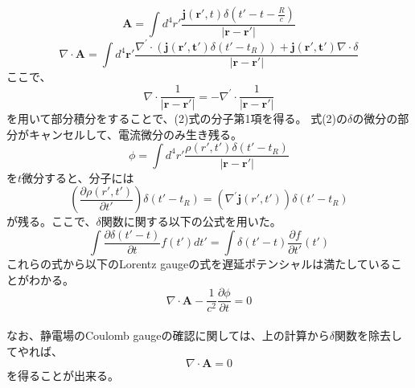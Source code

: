 \documentclass{jarticle}
\title{}
\author{}
\begin{document}
\maketitle

\begin{equation}
\bm{A} = \int d^4r' \frac{\bm{j}(\bm{r'},t)\delta(t'-t-\frac{R}{c})}{|\bm{r}-\bm{r'}|}
\end{equation}
\begin{equation}
\nabla \cdot \bm{A} = \int d^4\bm{r'} \frac{\nabla^\prime\cdot(\bm{j(r',t')}\delta(t'-t_R)) + \bm{j(r',t')}\nabla\cdot\delta}{|\bm{r}-\bm{r'}|}
\end{equation}
ここで、
\begin{equation}
\nabla\cdot\frac{1}{|\bm{r}-\bm{r'}|}=-\nabla^\prime\cdot\frac{1}{|\bm{r}-\bm{r'}|}
\end{equation}
を用いて部分積分をすることで、(2)式の分子第1項を得る。
式(2)の$\delta$の微分の部分がキャンセルして、電流微分のみ生き残る。
\begin{equation}
\phi = \int d^4 r' \frac{\rho(r',t')\delta(t'-t_R)}{|\bm{r}-\bm{r'}|}
\end{equation}
を$t$微分すると、分子には
\begin{equation}
(\frac{\partial \rho(r',t')}{\partial t'})\delta(t'-t_R) =
(\nabla^\prime\bm{j}(r',t'))\delta(t'-t_R)
\end{equation}
が残る。ここで、$\delta$関数に関する以下の公式を用いた。
\begin{equation}
\int \frac{\partial \delta(t'-t)}{\partial t}f(t')dt'=
\int \delta(t'-t)\frac{\partial f}{\partial t'}(t')
\end{equation}
これらの式から以下のLorentz gaugeの式を遅延ポテンシャルは満たしていることがわかる。
\begin{equation}
\nabla\cdot\bm{A} - \frac{1}{c^2}\frac{\partial \phi}{\partial t}=0
\end{equation}
\\

なお、静電場のCoulomb gaugeの確認に関しては、上の計算から$\delta$関数を除去してやれば、
\[ \nabla\cdot \bm{A} = 0\]
を得ることが出来る。
\end{document}
